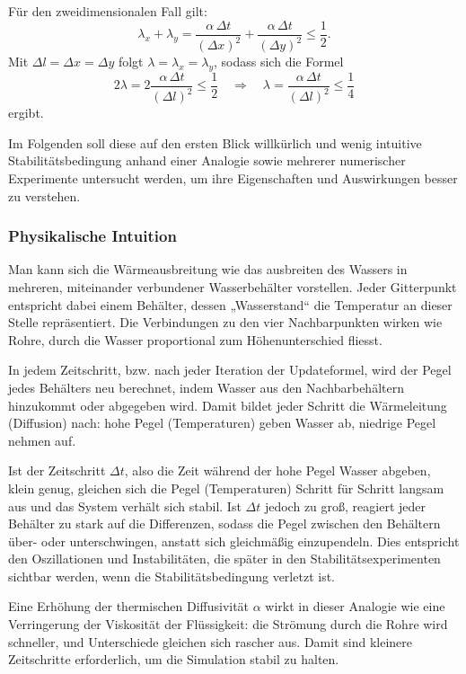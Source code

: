 Für den zweidimensionalen Fall gilt:
\begin{equation}
	\lambda_x + \lambda_y =
	\frac{\alpha \, \Delta t}{(\Delta x)^2} +
	\frac{\alpha \, \Delta t}{(\Delta y)^2} \leq \frac{1}{2}.
\end{equation}
Mit \(\Delta l = \Delta x = \Delta y\) folgt \(\lambda = \lambda_x = \lambda_y\), sodass sich die Formel
\begin{equation}
	\label{parallelisierung:eq:stabForExp}
	2\lambda = 2 \frac{\alpha \, \Delta t}{(\Delta l)^2} \leq \frac{1}{2}
	\quad \Rightarrow \quad
	\lambda = \frac{\alpha \, \Delta t}{(\Delta l)^2} \leq \frac{1}{4}
\end{equation}
ergibt.

Im Folgenden soll diese auf den ersten Blick willkürlich und wenig intuitive Stabilitätsbedingung anhand einer Analogie sowie mehrerer numerischer Experimente untersucht werden, um ihre Eigenschaften und Auswirkungen besser zu verstehen.

\subsubsection{Physikalische Intuition}  
Man kann sich die Wärmeausbreitung wie das ausbreiten des Wassers in mehreren, miteinander verbundener Wasserbehälter vorstellen.
Jeder Gitterpunkt entspricht dabei einem Behälter, dessen „Wasserstand“ die Temperatur an dieser Stelle repräsentiert.
Die Verbindungen zu den vier Nachbarpunkten wirken wie Rohre, durch die Wasser proportional zum Höhenunterschied fliesst.

In jedem Zeitschritt, bzw. nach jeder Iteration der Updateformel, wird der Pegel jedes Behälters neu berechnet, indem Wasser aus den Nachbarbehältern hinzukommt oder abgegeben wird.
Damit bildet jeder Schritt die Wärmeleitung (Diffusion) nach: hohe Pegel (Temperaturen) geben Wasser ab, niedrige Pegel nehmen auf.

Ist der Zeitschritt  \(\Delta t\), also die Zeit während der hohe Pegel Wasser abgeben, klein genug, gleichen sich die Pegel (Temperaturen) Schritt für Schritt langsam aus und das System verhält sich stabil.
Ist \(\Delta t\) jedoch zu groß, reagiert jeder Behälter zu stark auf die Differenzen, sodass die Pegel zwischen den Behältern über- oder unterschwingen, anstatt sich gleichmäßig einzupendeln.
Dies entspricht den Oszillationen und Instabilitäten, die später in den Stabilitätsexperimenten sichtbar werden, wenn die Stabilitätsbedingung verletzt ist.

Eine Erhöhung der thermischen Diffusivität \(\alpha\) wirkt in dieser Analogie wie eine Verringerung der Viskosität der Flüssigkeit: die Strömung durch die Rohre wird schneller, und Unterschiede gleichen sich rascher aus.
Damit sind kleinere Zeitschritte erforderlich, um die Simulation stabil zu halten.

